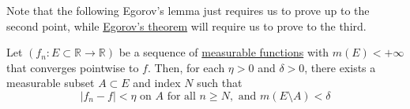   Note that the following Egorov's lemma just requires us to prove up to the second point, while \hyperref[thm:egorovs-theorem]{Egorov's theorem} will require us to prove to the third. 

  \begin{lemma}[Egorov]
    \label{thm:egorov}
    Let $(f_n: E \subset \mathbb{R} \to \mathbb{R})$ be a sequence of \hyperref[def:measurable-function]{measurable functions} with $m(E) < +\infty$ that converges pointwise to $f$. Then, for each $\eta > 0$ and $\delta > 0$, there exists a measurable subset $A \subset E$ and index $N$ such that 
    \begin{equation}
      |f_n - f| < \eta \text{ on } A \text{ for all } n \geq N, \text{ and } m(E \setminus A) < \delta 
    \end{equation}
  \end{lemma}
